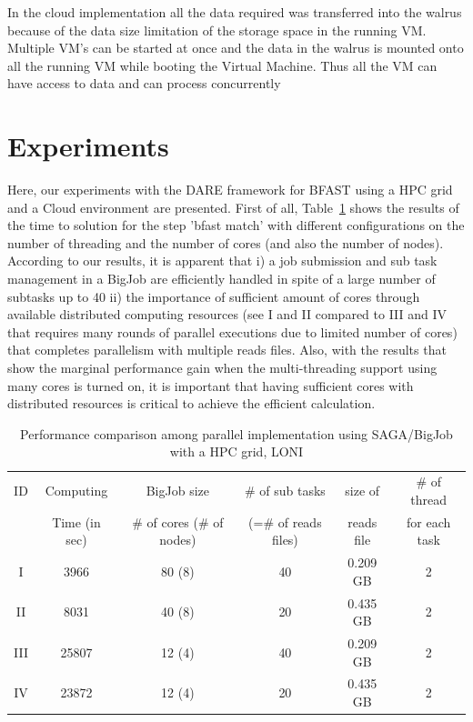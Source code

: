 \documentclass[12pt]{article}
\begin{document}
In the cloud implementation all the data required was transferred into the walrus because of the data size limitation of the storage space in the
running VM. Multiple VM's can be started at once and the data in the walrus is mounted onto all the running VM
while booting the Virtual Machine. Thus all the VM can have access to data and can process concurrently

\section{Experiments}

Here, our experiments with the DARE framework for BFAST using a HPC grid and a Cloud environment are presented.  First of all, Table~\ref{table:bigjob-loni} shows the results of the time to solution for the step 'bfast match' with different configurations on the number of threading and the number of cores (and also the number of nodes).  According to our results, it is apparent that i) a job submission and sub task management in a BigJob are efficiently handled in spite of a large number of subtasks up to 40 ii) the importance of sufficient amount of cores through available distributed computing resources (see I and II compared to III and IV that requires many rounds of parallel executions due to limited number of cores) that completes parallelism with multiple reads files.  Also, with the results that show the marginal performance gain when the multi-threading support using many cores is turned on, it is important that having sufficient cores with distributed resources is critical to achieve the efficient calculation.  


 \begin{table}
 \begin{tabular}{|cccccc |} 
 \hline 
ID &  Computing & BigJob size  &  \# of sub tasks & size of  & \# of thread  \\
 &  Time (in sec) & \# of cores (\# of nodes) &  (=\# of reads files) & reads file & for each task\\\hline
I   & 3966 & 80  (8) &  40 & 0.209 GB & 2 \\
II & 8031 & 40 (8)  &  20 & 0.435 GB & 2 \\
III & 25807 & 12 (4)  & 40  & 0.209 GB & 2 \\
IV & 23872 & 12 (4)  & 20 & 0.435 GB & 2 \\

 \hline
 \end{tabular}
\caption{Performance comparison among parallel implementation using SAGA/BigJob with a HPC grid, LONI}
\label{table:bigjob-loni} 
\end{table}
 
\end{document}
